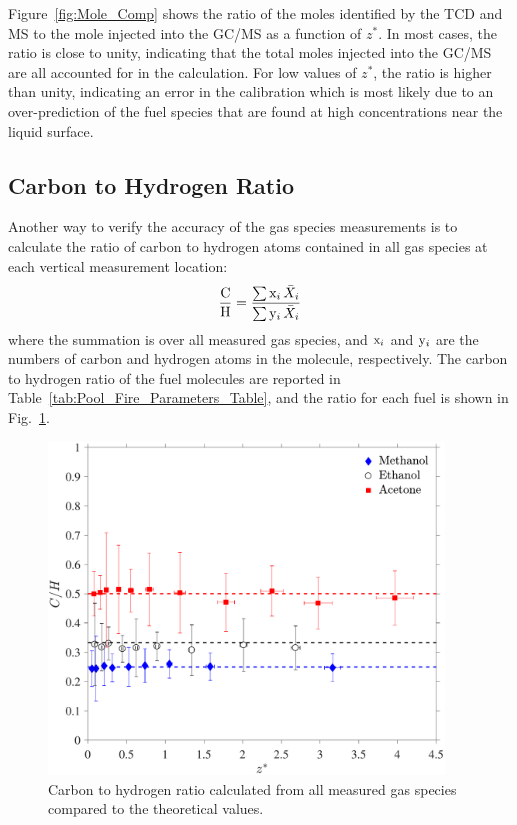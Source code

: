 \documentclass[12pt]{article}
\begin{document}
Figure~\ref{fig:Mole_Comp} shows the ratio of the moles identified by the TCD and MS to the mole injected into the GC/MS as a function of $z^*$. In most cases, the ratio is close to unity, indicating that the total moles injected into the GC/MS are all accounted for in the calculation. For low values of $z^*$, the ratio is higher than unity, indicating an error in the calibration which is most likely due to an over-prediction of the fuel species that are found at high concentrations near the liquid surface.

\subsection{Carbon to Hydrogen Ratio}

Another way to verify the accuracy of the gas species measurements is to calculate the ratio of carbon to hydrogen atoms contained in all gas species at each vertical measurement location:
\begin{equation}\label{eq:c2h_ratio}
  \frac{\rm C}{\rm H}=\frac{ \sum  {\rm x}_i \, \bar{X}_{i} }{ \sum {\rm y}_i \, \bar{X}_{i} }
\end{equation}
where the summation is over all measured gas species, and ${\rm x}_i$ and ${\rm y}_i$ are the numbers of carbon and hydrogen atoms in the molecule, respectively. The carbon to hydrogen ratio of the fuel molecules are reported in Table~\ref{tab:Pool_Fire_Parameters_Table}, and the ratio for each fuel is shown in Fig.~\ref{fig:C2H}.

\begin{figure}[h!]
	\centering
\includegraphics[width=10.5cm, keepaspectratio]{C2H_ratio_Comparison.pdf}
	\caption[Carbon to hydrogen ratio calculated from all species]{Carbon to hydrogen ratio calculated from all measured gas species compared to the theoretical values.}
	\label{fig:C2H}
\end{figure}
\end{document}
